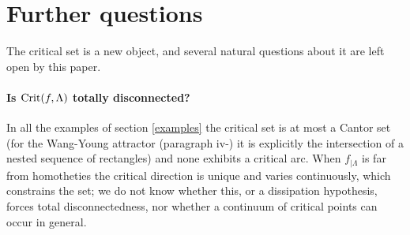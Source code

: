 \documentclass[a4paper,11pt]{article}
\newtheorem{lemma}{Lemma}
\theoremstyle{definition}
\def\La{\Lambda}
\def\la{\lambda}
\def\de{\delta}
\def\La{\Lambda}
\def\be{\beta}
\def\al{\alpha}
\begin{document}







\section{Further questions}\label{sec:questions}

 
 The critical set is a new
object, and several natural questions about it are left open by this paper.

\paragraph{Is ${\rm Crit}(f,\La)$ totally disconnected?} In all the examples of
section \ref{examples} the critical set is at most a Cantor set (for the
Wang-Young attractor (paragraph iv-) it is explicitly the intersection of a
nested sequence of rectangles) and none exhibits a critical arc. When
$f_{|\La}$ is far from homotheties the critical direction is unique and
varies continuously, which constrains the set; we do not know whether this,
or a dissipation hypothesis, forces total disconnectedness, nor whether a
continuum of critical points can occur in general.
\end{document}

